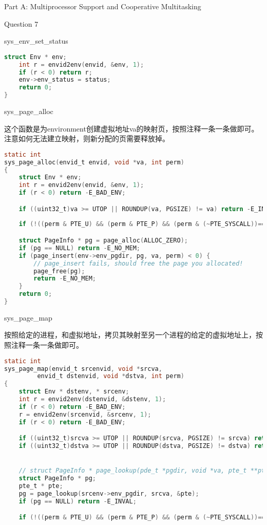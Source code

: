 \documentclass[GBK,winfonts,a4paper,10pt]{ctexart}
\begin{document}
\begin{section}{Part A: Multiprocessor Support and Cooperative Multitasking}
\begin{subsection}{Question 7}
\begin{subsubsection}{sys\_env\_set\_status}
\begin{lstlisting}[language=C]
	struct Env * env;
	int r = envid2env(envid, &env, 1);
	if (r < 0) return r;
	env->env_status = status;
	return 0;
}
\end{lstlisting}
\end{subsubsection}

\begin{subsubsection}{sys\_page\_alloc}
\par
这个函数是为environment创建虚拟地址va的映射页，按照注释一条一条做即可。注意如何无法建立映射，则新分配的页需要释放掉。
\begin{lstlisting}[language=C]
static int
sys_page_alloc(envid_t envid, void *va, int perm)
{
	struct Env * env;
	int r = envid2env(envid, &env, 1);
	if (r < 0) return -E_BAD_ENV;

	if ((uint32_t)va >= UTOP || ROUNDUP(va, PGSIZE) != va) return -E_INVAL;
	
	if (!((perm & PTE_U) && (perm & PTE_P) && (perm & (~PTE_SYSCALL))==0)) return -E_INVAL;

	struct PageInfo * pg = page_alloc(ALLOC_ZERO);
	if (pg == NULL) return -E_NO_MEM;
	if (page_insert(env->env_pgdir, pg, va, perm) < 0) {
		// page_insert fails, should free the page you allocated!  
		page_free(pg);
		return -E_NO_MEM;
	}
	return 0;
}
\end{lstlisting}
\end{subsubsection}

\begin{subsubsection}{sys\_page\_map}
\par
按照给定的进程，和虚拟地址，拷贝其映射至另一个进程的给定的虚拟地址上，按照注释一条一条做即可。
\begin{lstlisting}[language=C]
static int
sys_page_map(envid_t srcenvid, void *srcva,
	     envid_t dstenvid, void *dstva, int perm)
{
	struct Env * dstenv, * srcenv;
	int r = envid2env(dstenvid, &dstenv, 1);
	if (r < 0) return -E_BAD_ENV;
	r = envid2env(srcenvid, &srcenv, 1);
	if (r < 0) return -E_BAD_ENV;

	if ((uint32_t)srcva >= UTOP || ROUNDUP(srcva, PGSIZE) != srcva) return -E_INVAL;
	if ((uint32_t)dstva >= UTOP || ROUNDUP(dstva, PGSIZE) != dstva) return -E_INVAL;


	// struct PageInfo * page_lookup(pde_t *pgdir, void *va, pte_t **pte_store)
	struct PageInfo * pg;
	pte_t * pte;
	pg = page_lookup(srcenv->env_pgdir, srcva, &pte);
	if (pg == NULL) return -E_INVAL;		

	if (!((perm & PTE_U) && (perm & PTE_P) && (perm & (~PTE_SYSCALL))==0)) return -E_INVAL;
	

\end{lstlisting}
\end{subsubsection}
\end{subsection}
\end{section}
\end{document}
